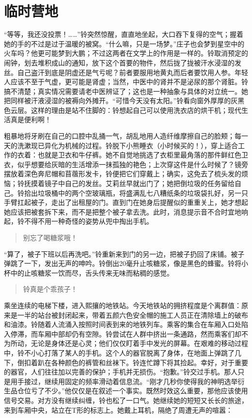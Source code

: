 \chapter{临时营地}

“等等，我还没投票！……”铃突然惊醒，直直地坐起，大口吞下复得的空气；握着她的手的不过是过于温暖的被窝。“什么嘛，只是一场梦。”庄子也会梦到星空中的火车吗？他更可能梦到大鹏；不过这两者在文学上的作用是一样的。铃取消预定的闹钟，划去堆积成山的通知，放下这个首要的物件，然后拢了拢被汗水浸湿的发丝。自己盗汗到底是阴虚还是气亏呢？前者要服用地黄丸而后者要饮用人参。年轻人应该不至于气虚，更可能是肾虚；当然，中医中的肾并不是泌尿的那个肾脏。铃搞不清楚；真实情况需要请老中医辨证了；这也是一种抽象与具体的对立统一。她把同样被汗液浸湿的被褥向外摊开。“可惜今天没有太阳。”铃看向窗外厚厚的灰黑色云层。这样的理由是站不住脚的：铃想起自己可以使用洗衣店的烘干机；现代生活真是便利啊！

粗暴地将牙刷在自己的口腔中乱捅一气，胡乱地用人造纤维摩擦自己的脸颊；每一天的洗漱现已异化为机械的过程。铃脱下小熊睡衣（小时候买的！），穿上适合工作的衣着：也就是卫衣和牛仔裤。她不自觉地挑选了衣柜里最角落的那件鲜红色卫衣，似乎想要给灰暗的生活增添一抹孤独的艳色；上次穿这件是什么时候了？镜旁摆放着深色奔尼帽和苜蓿形发卡，铃便把它们穿戴上；确实，这免去了梳头发的烦恼；铃抚摸着镜子中自己的发丝。艾莉丝早就出门了；她把倒垃圾的任务留给自己。铃拾出垃圾桶中的两个空玻璃瓶，将盛满乱七八糟纸条的垃圾袋扎好，另一只手臂扛起被子，走出了出租屋的门。直到门在她身后提醒似的重重关上，她才想起她应该把被套拆下来，而不是把整个被子拿去洗。此时，消息提示音不合时宜地响起，铃不得不用一种奇怪的姿势从兜中掏出手机。

\begin{quote}
 别忘了喝糖浆哦！
\end{quote}

“算了，被子下班以后再洗吧。”铃重新来到门的另一边，把被子扔回了床铺。被子弹跳了一下，发出无声的呻吟。铃倒出20毫升止咳糖浆，像是黑色的蜂蜜。铃将小杯中的止咳糖浆一饮而尽，舌头传来无味而粘稠的感觉。

\begin{quote}
 铃真是个乖孩子！
\end{quote}

乘坐连续的电梯下楼，进入熙攘的地铁站。今天地铁站的拥挤程度是个离群值：原来是一半的站台被封闭起来，带着五颜六色安全帽的施工人员正在清除墙上的破布和油漆。铃随着人流涌入按照时间表到来的地铁列车。乘客的集合在车厢入口处陷入停滞，而车厢中部却仍有空隙。铃尝试在人群中挤出一条通路，然而乘客们却不为所动，无论是身体还是心灵；他们仅仅盯着手中发光的屏幕。在艰难的移动过程中，铃不小心打落了某人的手机。这个人的器官脱离了身体，在地面上弹跳了几下，倒扣着趴在各种颜色的裤管和丝袜下。铃连忙蹲下将其捡起。幸好，对于重要的器官，人们往往加以完善的保护；手机并无损伤。“抱歉。”铃交过手机。那人只是用手接过，继续用固定的频率滑动着信息流。“刚才几秒你使得我的神明选举衍生品仓位亏了不少。”他仅仅是在叙述一个事实。既然时效这么重要，那他应该使用信号交易。对方没有继续纠缠，铃也松了一口气。她继续她的短短又长长的旅途，来到车厢中央，站立在T形的标志上。她戴上耳机，隔绝了周遭无声的喧嚣：

